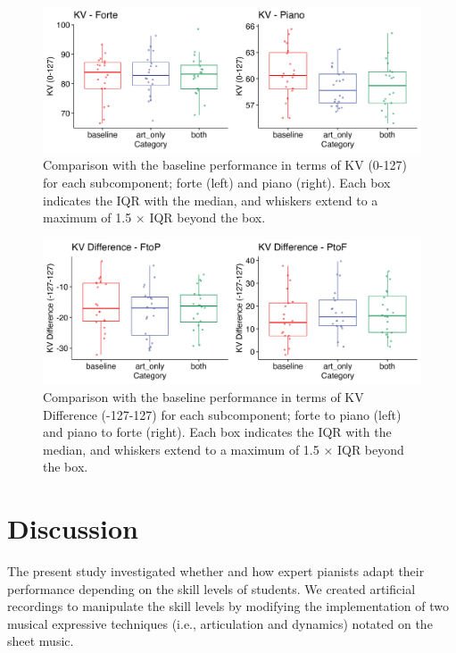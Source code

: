 \documentclass[
  man]{apa6}
\begin{document}
\begin{figure}
\includegraphics[width=1\linewidth]{manuscript_files/figure-latex/plot-vel-2-1} \caption{\label{fig:vel-2}Comparison with the baseline performance in terms of KV (0-127) for each subcomponent; forte (left) and piano (right). Each box indicates the IQR with the median, and whiskers extend to a maximum of 1.5 × IQR beyond the box.}\label{fig:plot-vel-2}
\end{figure}

\begin{figure}
\includegraphics[width=1\linewidth]{manuscript_files/figure-latex/plot-vel-diff-2-1} \caption{\label{fig:vel-diff-2}Comparison with the baseline performance in terms of KV Difference (-127-127) for each subcomponent; forte to piano (left) and piano to forte (right). Each box indicates the IQR with the median, and whiskers extend to a maximum of 1.5 × IQR beyond the box.}\label{fig:plot-vel-diff-2}
\end{figure}

\hypertarget{discussion}{%
\section{Discussion}\label{discussion}}

The present study investigated whether and how expert pianists adapt their performance depending on the skill levels of students. We created artificial recordings to manipulate the skill levels by modifying the implementation of two musical expressive techniques (i.e., articulation and dynamics) notated on the sheet music.
\end{document}
